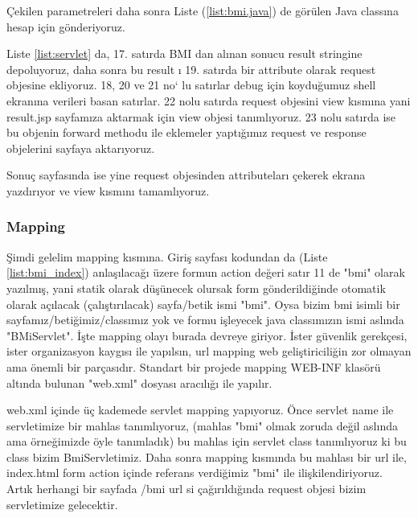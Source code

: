 
Çekilen parametreleri daha sonra Liste (\ref{list:bmi.java}) de görülen Java classına hesap için gönderiyoruz. 



Liste \ref{list:servlet} da, 17. satırda BMI dan alınan sonucu result stringine depoluyoruz, daha sonra bu result ı 19. satırda bir attribute olarak request objesine ekliyoruz. 18, 20 ve 21 no` lu satırlar debug için koyduğumuz shell ekranına verileri basan satırlar. 22 nolu satırda request objesini view kısmına yani result.jsp sayfamıza aktarmak için view objesi tanımlıyoruz. 23 nolu satırda ise bu objenin forward methodu ile eklemeler yaptığımız request ve response objelerini sayfaya aktarıyoruz.

Sonuç sayfasında ise yine request objesinden attributeları çekerek ekrana yazdırıyor ve view kısmını tamamlıyoruz.
\subsubsection{Mapping}

Şimdi gelelim mapping kısmına. Giriş sayfası  kodundan da (Liste \ref{list:bmi_index}) anlaşılacağı üzere formun action değeri satır 11 de  "bmi" olarak yazılmış, yani statik olarak düşünecek olursak form gönderildiğinde otomatik olarak açılacak (çalıştırılacak) sayfa/betik ismi "bmi". Oysa bizim bmi isimli bir sayfamız/betiğimiz/classımız yok ve formu işleyecek java classımızın ismi aslında "BMiServlet". İşte mapping olayı burada devreye giriyor. İster güvenlik gerekçesi, ister organizasyon kaygısı ile yapılsın, url mapping web geliştiriciliğin zor olmayan ama önemli bir parçasıdır. Standart bir projede mapping WEB-INF klasörü altında bulunan "web.xml" dosyası aracılığı ile yapılır. 

web.xml içinde üç kademede servlet mapping yapıyoruz. Önce servlet name ile servletimize bir mahlas tanımlıyoruz, (mahlas "bmi" olmak zoruda değil aslında ama örneğimizde öyle tanımladık) bu mahlas için servlet class tanımlıyoruz ki bu class bizim BmiServletimiz. Daha sonra mapping kısmında bu mahlası bir url ile, index.html form action içinde referans verdiğimiz "bmi" ile ilişkilendiriyoruz. Artık herhangi bir sayfada /bmi url si çağırıldığında request objesi bizim servletimize gelecektir. 



